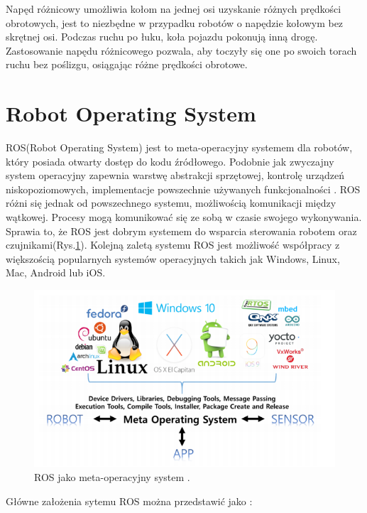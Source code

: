  Napęd różnicowy umożliwia kołom na jednej osi uzyskanie różnych prędkości obrotowych, jest to niezbędne w przypadku robotów o napędzie kołowym bez skrętnej osi. Podczas ruchu po łuku, koła pojazdu pokonują inną drogę. Zastosowanie napędu różnicowego pozwala, aby toczyły się one po swoich torach ruchu bez poślizgu, osiągając różne prędkości obrotowe.
\section{Robot Operating System}

ROS(Robot Operating System) jest to meta-operacyjny systemem dla robotów, który posiada otwarty dostęp do kodu źródłowego. Podobnie jak zwyczajny system operacyjny zapewnia warstwę abstrakcji sprzętowej, kontrolę urządzeń niskopoziomowych, implementacje powszechnie używanych funkcjonalności \cite{ROS}. ROS różni się jednak od powszechnego systemu, możliwością komunikacji między wątkowej. Procesy mogą komunikować się ze sobą w czasie swojego wykonywania. Sprawia to, że ROS jest dobrym systemem do wsparcia sterowania robotem oraz czujnikami(Rys.\ref{fig:ROS_meta_system}). Kolejną zaletą systemu ROS jest możliwość współpracy z większością popularnych systemów operacyjnych takich jak Windows, Linux, Mac, Android lub iOS. 

\begin{figure}[ht]
	\centering
	\includegraphics[scale=1]{ROS_meta_system.png}
	\caption{ROS jako meta-operacyjny system \cite{ROS}.}
	\label{fig:ROS_meta_system}
\end{figure}

Główne założenia sytemu ROS można przedstawić jako \cite{ROS_goals}:

